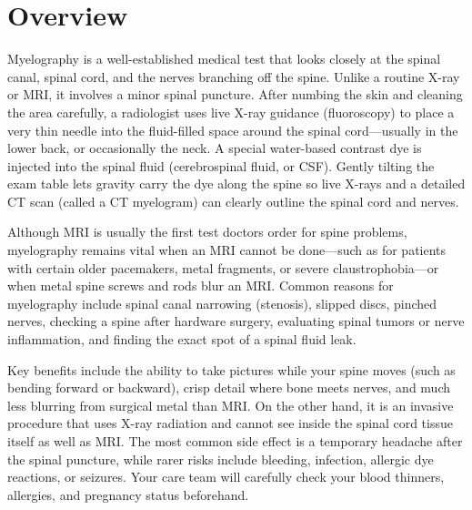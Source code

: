 \label{ch:infographic-myelography}

\section{Overview}

Myelography is a well-established medical test that looks closely at the spinal canal, spinal cord, and the nerves branching off the spine. Unlike a routine X-ray or MRI, it involves a minor spinal puncture. After numbing the skin and cleaning the area carefully, a radiologist uses live X-ray guidance (fluoroscopy) to place a very thin needle into the fluid-filled space around the spinal cord---usually in the lower back, or occasionally the neck. A special water-based contrast dye is injected into the spinal fluid (cerebrospinal fluid, or CSF). Gently tilting the exam table lets gravity carry the dye along the spine so live X-rays and a detailed CT scan (called a CT myelogram) can clearly outline the spinal cord and nerves.

Although MRI is usually the first test doctors order for spine problems, myelography remains vital when an MRI cannot be done---such as for patients with certain older pacemakers, metal fragments, or severe claustrophobia---or when metal spine screws and rods blur an MRI. Common reasons for myelography include spinal canal narrowing (stenosis), slipped discs, pinched nerves, checking a spine after hardware surgery, evaluating spinal tumors or nerve inflammation, and finding the exact spot of a spinal fluid leak.

Key benefits include the ability to take pictures while your spine moves (such as bending forward or backward), crisp detail where bone meets nerves, and much less blurring from surgical metal than MRI. On the other hand, it is an invasive procedure that uses X-ray radiation and cannot see inside the spinal cord tissue itself as well as MRI. The most common side effect is a temporary headache after the spinal puncture, while rarer risks include bleeding, infection, allergic dye reactions, or seizures. Your care team will carefully check your blood thinners, allergies, and pregnancy status beforehand.

